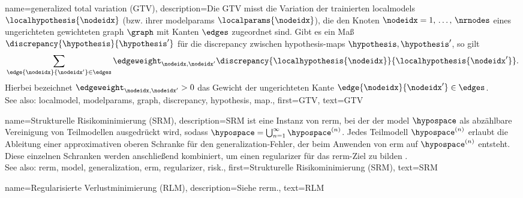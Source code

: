 {{{{
{name={generalized total variation (GTV)}, 
	description={Die GTV misst die Variation der trainierten \glspl{localmodel} $\localhypothesis{\nodeidx}$ 
		(bzw. ihrer \glspl{modelparam} $\localparams{\nodeidx}$), die den Knoten $\nodeidx=1, \,\ldots, \,\nrnodes$ 
		eines ungerichteten gewichteten \gls{graph} $\graph$ mit Kanten $\edges$ zugeordnet sind. 
		Gibt es ein Maß $\discrepancy{\hypothesis}{\hypothesis'}$ für die \gls{discrepancy} zwischen \gls{hypothesis}-\glspl{map} $\hypothesis,\hypothesis'$, so gilt
		\begin{equation} 
			\nonumber
			\sum_{\edge{\nodeidx}{\nodeidx'}\in \edges} \edgeweight_{\nodeidx,\nodeidx'} 
			\discrepancy{\localhypothesis{\nodeidx}}{\localhypothesis{\nodeidx'}}.
		\end{equation}
		Hierbei bezeichnet $\edgeweight_{\nodeidx,\nodeidx'}>0$ das Gewicht der ungerichteten Kante $\edge{\nodeidx}{\nodeidx'}\in \edges$.
		\\
		See also: \gls{localmodel}, \glspl{modelparam}, \gls{graph}, \gls{discrepancy}, \gls{hypothesis}, \gls{map}.},
	first={GTV},
	text={GTV} 
}
	
{name={Strukturelle Risikominimierung (SRM)}, 
	description={SRM ist eine 
		Instanz von \gls{rerm}, bei der der \gls{model} $\hypospace$ als abzählbare Vereinigung von Teilmodellen ausgedrückt wird, sodass 
		$\hypospace = \bigcup_{n=1}^{\infty} \hypospace^{(n)}$. 
		Jedes Teilmodell $\hypospace^{(n)}$ erlaubt die Ableitung einer approximativen oberen Schranke 
		für den \gls{generalization}-Fehler, der beim Anwenden von \gls{erm} auf $\hypospace^{(n)}$ entsteht. 
		Diese einzelnen Schranken werden anschließend kombiniert, um einen \gls{regularizer} für das \gls{rerm}-Ziel zu bilden \cite[Sec.\ 7.2]{ShalevMLBook}.
		\\
		See also: \gls{rerm}, \gls{model}, \gls{generalization}, \gls{erm}, \gls{regularizer}, \gls{risk}.},
	first={Strukturelle Risikominimierung (SRM)},
	text={SRM}
 } 

{name={Regularisierte Verlustminimierung (RLM)},
	description={Siehe \gls{rerm}.},
	text={RLM}
}

}}}}
